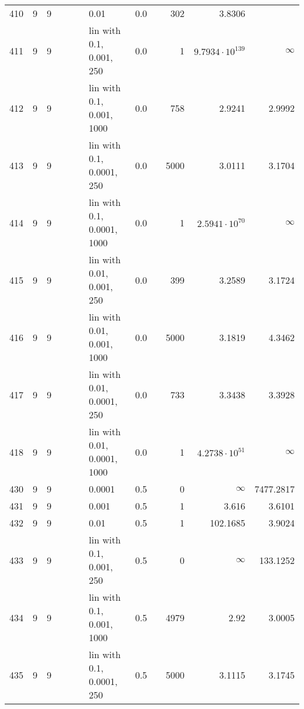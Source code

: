 \begin{longtable}{lrrrrrlrrrrr}
 410 &       9 & 9 &   &   &   &                        0.01 &  0.0 &        &     302 &                 3.8306 &                        \\
 411 &       9 & 9 &   &   &   &    lin with 0.1, 0.001, 250 &  0.0 &        &       1 & $9.7934\cdot 10^{139}$ &               $\infty$ \\
 412 &       9 & 9 &   &   &   &   lin with 0.1, 0.001, 1000 &  0.0 &        &     758 &                 2.9241 &                 2.9992 \\
 413 &       9 & 9 &   &   &   &   lin with 0.1, 0.0001, 250 &  0.0 &        &    5000 &                 3.0111 &                 3.1704 \\
 414 &       9 & 9 &   &   &   &  lin with 0.1, 0.0001, 1000 &  0.0 &        &       1 &  $2.5941\cdot 10^{70}$ &               $\infty$ \\
 415 &       9 & 9 &   &   &   &   lin with 0.01, 0.001, 250 &  0.0 &        &     399 &                 3.2589 &                 3.1724 \\
 416 &       9 & 9 &   &   &   &  lin with 0.01, 0.001, 1000 &  0.0 &        &    5000 &                 3.1819 &                 4.3462 \\
 417 &       9 & 9 &   &   &   &  lin with 0.01, 0.0001, 250 &  0.0 &        &     733 &                 3.3438 &                 3.3928 \\
 418 &       9 & 9 &   &   &   & lin with 0.01, 0.0001, 1000 &  0.0 &        &       1 &  $4.2738\cdot 10^{51}$ &               $\infty$ \\
 430 &       9 & 9 &   &   &   &                      0.0001 &  0.5 &        &       0 &               $\infty$ &              7477.2817 \\
 431 &       9 & 9 &   &   &   &                       0.001 &  0.5 &        &       1 &                  3.616 &                 3.6101 \\
 432 &       9 & 9 &   &   &   &                        0.01 &  0.5 &        &       1 &               102.1685 &                 3.9024 \\
 433 &       9 & 9 &   &   &   &    lin with 0.1, 0.001, 250 &  0.5 &        &       0 &               $\infty$ &               133.1252 \\
 434 &       9 & 9 &   &   &   &   lin with 0.1, 0.001, 1000 &  0.5 &        &    4979 &                   2.92 &                 3.0005 \\
 435 &       9 & 9 &   &   &   &   lin with 0.1, 0.0001, 250 &  0.5 &        &    5000 &                 3.1115 &                 3.1745 \\

\end{longtable}
